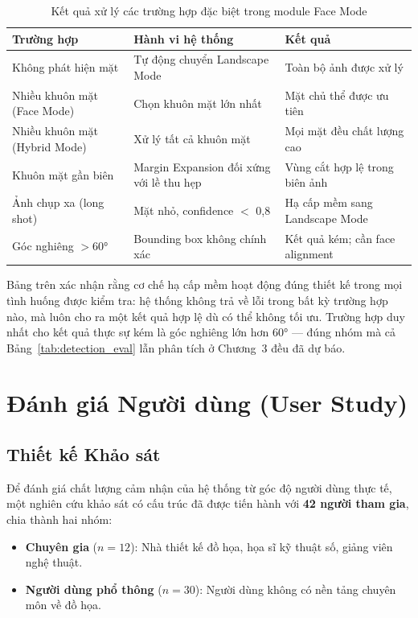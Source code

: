 \begin{table}[H]
\caption{Kết quả xử lý các trường hợp đặc biệt trong module Face Mode}
\label{tab:edge_cases}
\centering
\begin{tabular}{|p{3.5cm}|p{4.5cm}|p{5cm}|}
\hline
\textbf{Trường hợp} & \textbf{Hành vi hệ thống} & \textbf{Kết quả} \\
\hline
Không phát hiện mặt & Tự động chuyển Landscape Mode & Toàn bộ ảnh được xử lý \\
\hline
Nhiều khuôn mặt (Face Mode) & Chọn khuôn mặt lớn nhất & Mặt chủ thể được ưu tiên \\
\hline
Nhiều khuôn mặt (Hybrid Mode) & Xử lý tất cả khuôn mặt & Mọi mặt đều chất lượng cao \\
\hline
Khuôn mặt gần biên & Margin Expansion đối xứng với lề thu hẹp & Vùng cắt hợp lệ trong biên ảnh \\
\hline
Ảnh chụp xa (long shot) & Mặt nhỏ, confidence $<$ 0,8 & Hạ cấp mềm sang Landscape Mode \\
\hline
Góc nghiêng $>60°$ & Bounding box không chính xác & Kết quả kém; cần face alignment \\
\hline
\end{tabular}
\end{table}

Bảng trên xác nhận rằng cơ chế hạ cấp mềm hoạt động đúng thiết kế trong mọi tình huống được kiểm tra: hệ thống không trả về lỗi trong bất kỳ trường hợp nào, mà luôn cho ra một kết quả hợp lệ dù có thể không tối ưu. Trường hợp duy nhất cho kết quả thực sự kém là góc nghiêng lớn hơn $60°$ --- đúng nhóm mà cả Bảng~\ref{tab:detection_eval} lẫn phân tích ở Chương~3 đều đã dự báo.

\section{Đánh giá Người dùng (User Study)}
\label{sec:user_study}

\subsection{Thiết kế Khảo sát}
\label{subsec:user_study_design}

Để đánh giá chất lượng cảm nhận của hệ thống từ góc độ người dùng thực tế, một nghiên cứu khảo sát có cấu trúc đã được tiến hành với \textbf{42 người tham gia}, chia thành hai nhóm:
\begin{itemize}
    \item \textbf{Chuyên gia} ($n = 12$): Nhà thiết kế đồ họa, họa sĩ kỹ thuật số, giảng viên nghệ thuật.
    \item \textbf{Người dùng phổ thông} ($n = 30$): Người dùng không có nền tảng chuyên môn về đồ họa.
\end{itemize}

